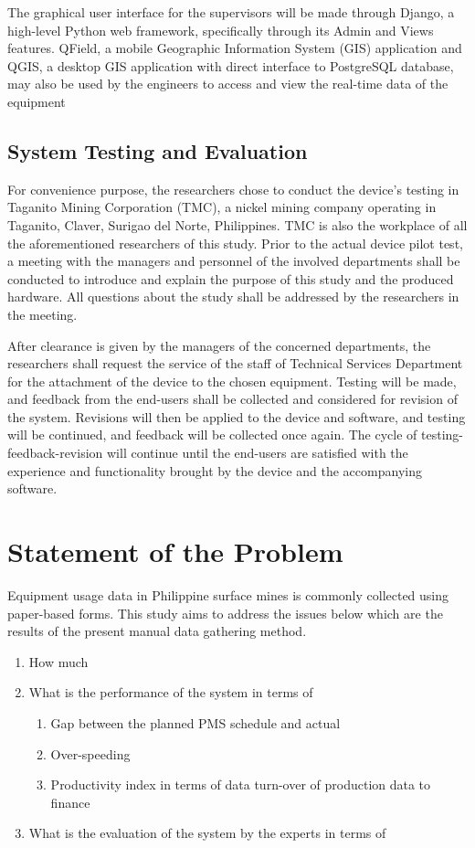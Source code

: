 \documentclass[12pt]{report}
\begin{document}
The graphical user interface for the supervisors will be made through Django, a high-level Python web framework, specifically through its Admin and Views features.
QField, a mobile Geographic Information System (GIS) application and QGIS, a desktop GIS application with direct interface to PostgreSQL database, may also be used by the engineers to access and view the real-time data of the equipment 

\subsection{System Testing and Evaluation}

For convenience purpose, the researchers chose to conduct the device's testing in Taganito Mining Corporation (TMC), a nickel mining company operating in Taganito, Claver, Surigao del Norte, Philippines.
TMC is also the workplace of all the aforementioned researchers of this study. 
Prior to the actual device pilot test, a meeting with the managers and personnel of the involved departments shall be conducted to introduce and explain the purpose of this study and the produced hardware. 
All questions about the study shall be addressed by the researchers in the meeting.

After clearance is given by the managers of the concerned departments, the researchers shall request the service of the staff of Technical Services Department for the attachment of the device to the chosen equipment.
Testing will be made, and feedback from the end-users shall be collected and considered for revision of the system.
Revisions will then be applied to the device and software, and testing will be continued, and feedback will be collected once again.
The cycle of testing-feedback-revision will continue until the end-users are satisfied with the experience and functionality brought by the device and the accompanying software.

\section{Statement of the Problem}

Equipment usage data in Philippine surface mines is commonly collected using paper-based forms.
This study aims to address the issues below which are the results of the present manual data gathering method.

\begin{enumerate}
    \item How much 
    \item What is the performance of the system in terms of
        \begin{enumerate}
            \item Gap between the planned PMS schedule and actual
            \item Over-speeding 
            \item Productivity index in terms of data turn-over of production data to finance
        \end{enumerate}
    \item What is the evaluation of the system by the experts in terms of
\end{enumerate}
\end{document}
